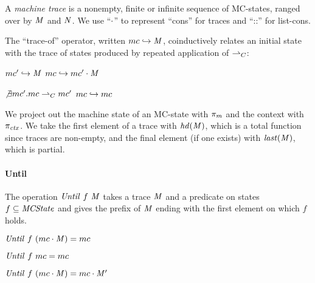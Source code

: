 \documentclass[10pt,conference]{ieeetran}%
\theoremstyle{definition}
\begin{document}
A {\em machine trace} is a nonempty, finite or infinite sequence
of MC-states, ranged over by \(\mathit{M}\) and \(\mathit{N}\).
We use ``\(\cdot\)'' to represent ``cons'' for traces and ``::'' for list-cons.

The ``trace-of'' operator, written \(mc \hookrightarrow \mathit{M}\),
coinductively relates an initial state with the trace of states
produced by repeated application of \(\overset{}{\rightharpoonup}_C\):
%
\vspace{-\bigskipamount}
\begin{center}
\begin{minipage}[t]{.6\columnwidth}
            {\(mc' \hookrightarrow \mathit{M}\)}
            {\(mc \hookrightarrow mc' \cdot \mathit{M}\)}%
\end{minipage}
\begin{minipage}[t]{.35\columnwidth}
\judgment%
         {\(\not\exists mc'. mc \overset{}{\rightharpoonup}_C mc'\)}
         {\(mc \hookrightarrow mc\)}
\end{minipage}
\end{center}
\vspace{-\smallskipamount}

We project out the machine state of an MC-state with \(\pi_m\)
and the context with \(\pi_{\mathit{ctx}}\).
We take the first element of a trace with \(\mathit{hd}(\mathit{M})\), which is a total
function since traces are non-empty, and the final element (if one exists) with
\(\mathit{last}(\mathit{M})\), which is partial.

\paragraph*{Until}
The operation \(\mathit{Until} ~ f ~ \mathit{M}\) takes a trace \(\mathit{M}\)
and a predicate on states \(f \subseteq \mathit{MCState}\) and gives the prefix of
\(\mathit{M}\) ending with the first element on which \(f\) holds.

\vspace{-\medskipamount}
\begin{center}
  \begin{minipage}[b]{.5\columnwidth}
             {\(\mathit{Until} ~ f ~ (mc \cdot \mathit{M}) = mc\)}
  \end{minipage}
%
  \begin{minipage}[b]{.3\columnwidth}
    \judgment{}
             {\(\mathit{Until} ~ f ~ mc = mc\)}
%
  \end{minipage}
\end{center}
                {\(\mathit{Until} ~ f ~ (mc \cdot \mathit{M}) = mc \cdot \mathit{M}'\)}
\end{document}
